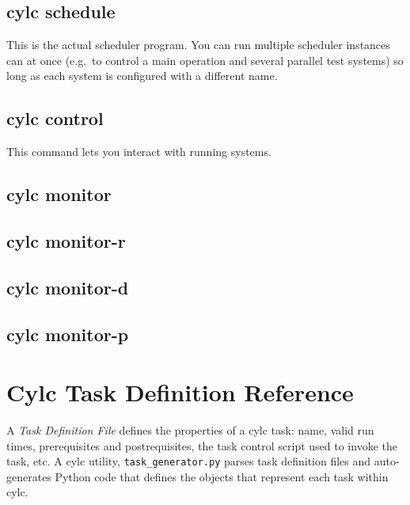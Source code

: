 \documentclass[11pt,a4paper]{article}
\begin{document}
{ \color{Magenta}
 
}

\pagebreak
\subsection{cylc schedule}

This is the actual scheduler program. You can run multiple scheduler
instances can at once (e.g.\ to control a main operation
and several parallel test systems) so long as each system is configured
with a different name. 
{
\color{Magenta}

}

\pagebreak
\subsection{cylc control}

This command lets you interact with running systems.

{
\color{Magenta}

}

\pagebreak
\subsection{cylc monitor}
{
\color{Magenta}

}

\subsection{cylc monitor-r}
{
\color{Magenta}

}

\subsection{cylc monitor-d}
{
\color{Magenta}

}

\subsection{cylc monitor-p}
{
\color{Magenta}

}

\pagebreak
\section{Cylc Task Definition Reference}

A {\em Task Definition File} defines the properties of a cylc task:
name, valid run times, prerequisites and postrequisites, the task
control script used to invoke the task, etc.  A cylc utility,
\verb=task_generator.py= parses task definition files and auto-generates
Python code that defines the objects that represent each task within
cylc.
\end{document}
